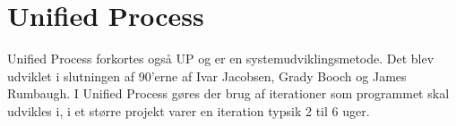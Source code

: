 \section{Unified Process}
Unified Process forkortes også UP og er en systemudviklingsmetode. Det blev udviklet i slutningen af 90'erne af Ivar Jacobsen, Grady Booch og James Rumbaugh. I Unified Process gøres der brug af iterationer som programmet skal udvikles i, i et større projekt varer en iteration typsik 2 til 6 uger. 